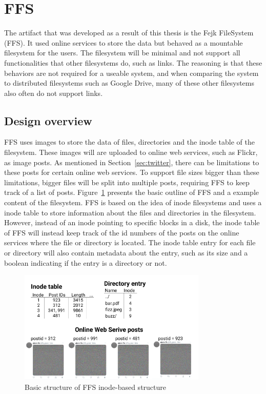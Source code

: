 \section{FFS}
The artifact that was developed as a result of this thesis is the Fejk FileSystem (FFS). It used online services to store the data but behaved as a mountable filesystem for the users. The filesystem will be minimal and not support all functionalities that other filesystems do, such as links. The reasoning is that these behaviors are not required for a useable system, and when comparing the system to distributed filesystems such as Google Drive, many of these other filesystems also often do not support links.

\subsection{Design overview}
FFS uses images to store the data of files, directories and the inode table of the filesystem. These images will are uploaded to online web services, such as Flickr, as image posts. As mentioned in Section~\ref{sec:twitter}, there can be limitations to these posts for certain online web services. To support file sizes bigger than these limitations, bigger files will be split into multiple posts, requiring FFS to keep track of a list of posts. Figure~\ref{fig:ffs_inode_diag} presents the basic outline of FFS and a example content of the filesystem. FFS is based on the idea of inode filesystems and uses a inode table to store information about the files and directories in the filesystem. However, instead of an inode pointing to specific blocks in a disk, the inode table of FFS will instead keep track of the id numbers of the posts on the online services where the file or directory is located. The inode table entry for each file or directory will also contain metadata about the entry, such as its size and a boolean indicating if the entry is a directory or not.

\begin{figure}[!ht]
	\begin{center}
	  \includegraphics[width=0.8\textwidth]{figures/ffs_inode_diagram.png}
	\end{center}
	\caption{Basic structure of FFS inode-based structure}
	\label{fig:ffs_inode_diag}
\end{figure}

